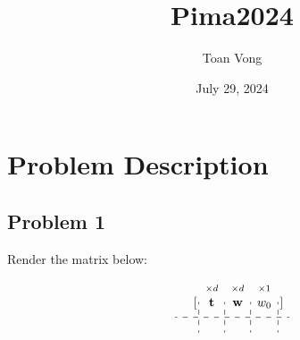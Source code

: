 \documentclass{article}
\title{Pima2024}
\author{Toan Vong}
\date{July 29, 2024}
\begin{document}
\maketitle
\tableofcontents
\pagebreak
\section{Problem Description}


\subsection{Problem 1}
Render the matrix below:

\[
    \begin{array}{rl@{}:cccc:cccc:c:@{}r r@{}c@{}l}
                                    &                                                                                            & \multicolumn{4}{c:}{\scriptstyle{\times d}}                   & \multicolumn{4}{c:}{\scriptstyle{\times d}}                & \multicolumn{1}{c:}{\scriptstyle{\times 1}}         &                                                                                                                                                                                                                                                                                               \\
                                    & \multirow{1}{*}{$\left[\begin{array}{r}\end{array}\right.$}                                & \multicolumn{4}{c:}{\multirow{1}{*}{$\mathbf t$}}             & \multicolumn{4}{c:}{\multirow{1}{*}{$\mathbf w$}}          & w_0                                                 & \multirow{1}{*}{$\left.\begin{array}{r}\end{array}\right]$}                                                                                                                                                                                                                                   \\[0.5em]
            \hdashline
            \rule{0pt}{0.1em}

\end{array}\]
\end{document}
